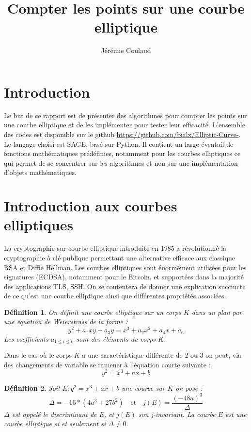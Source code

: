 \documentclass{article}
\title{Compter les points sur une courbe elliptique}
\author{Jérémie Coulaud}
\begin{document}
\newtheorem{prop}{Proposition}
\newtheorem{defi}{Définition}
\newtheorem{thm}{Théorème}
\maketitle
\newpage
\tableofcontents
\newpage

\section{Introduction}
Le but de ce rapport est de présenter des algorithmes pour compter les points sur une courbe elliptique et de les implémenter pour tester leur efficacité. L'ensemble des codes est disponible sur le github \url{https://github.com/bialx/Elliptic-Curve-}. Le langage choisi est SAGE, basé sur Python. Il contient un large éventail de fonctions mathématiques prédéfinies, notamment pour les courbes elliptiques ce qui permet de se concentrer sur les algorithmes et non sur une implémentation d'objets mathématiques.
\section{Introduction aux courbes elliptiques}
La cryptographie sur courbe elliptique introduite en 1985 a révolutionné la cryptographie à clé publique permettant une alternative efficace aux classique RSA et Diffie Hellman. Les courbes elliptiques sont énormément utilisées pour les signatures (ECDSA), notamment pour le Bitcoin, et supportées dans la majorité des applications TLS, SSH. On se contentera de donner une explication succincte de ce qu'est une courbe elliptique ainsi que différentes propriétés associées.

\begin{defi}
On définit une courbe elliptique sur un corps $K$ dans un plan par une équation de Weierstrass de la forme : 
\begin{equation*}
y^2 + a_1xy + a_3y  = x^3 + a_2x^2 + a_4x + a_6
\end{equation*}
Les coefficients $a_{1 \leq i \leq 6}$ sont des éléments du corps $K$.
\end{defi}

Dans le cas où le corps $K$ a une caractéristique différente de $2$ ou $3$ on peut, via des changements de variable se ramener à l'équation courte suivante : 
\begin{equation*}
y^2 = x^3 + ax +b
\end{equation*}

\begin{defi}
Soit $E : y^2 = x^3 + ax +b$ une courbe sur $K$ on pose : 
\begin{equation*}
\Delta = -16*(4a^3 + 27b^2) \quad \text{et} \quad j(E) = \frac{(-48a)^3}{\Delta}
\end{equation*}
$\Delta$ est appelé le discriminant de $E$, et $j(E)$ son j-invariant. La courbe $E$ est une courbe elliptique si et seulement si $\Delta \ne 0$.
\end{defi}
\end{document}
